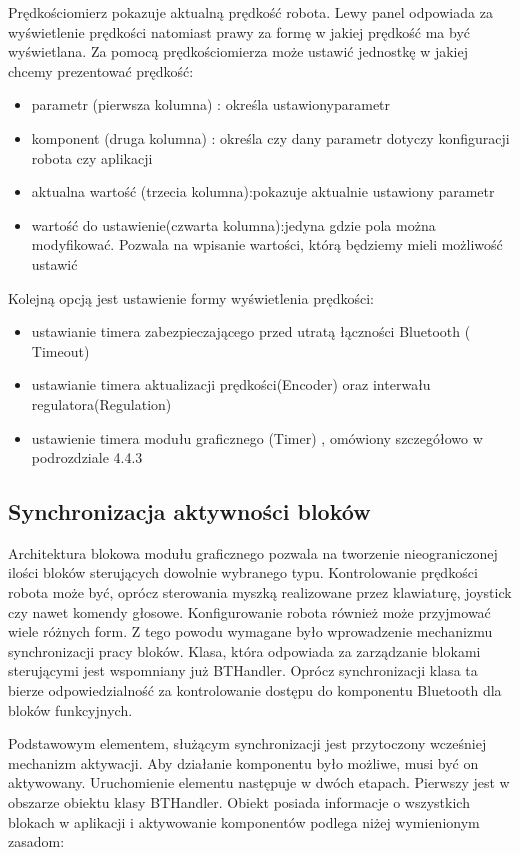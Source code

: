\documentclass[eng,printmode]{mgr}
\begin{document}
Prędkościomierz pokazuje aktualną prędkość robota. Lewy panel odpowiada za wyświetlenie prędkości natomiast prawy za formę w jakiej prędkość ma być wyświetlana. Za pomocą prędkościomierza może ustawić jednostkę w jakiej chcemy prezentować  prędkość:
\begin{itemize}
 \item parametr (pierwsza kolumna) : określa ustawionyparametr
 \item komponent (druga kolumna) : określa czy dany parametr dotyczy konfiguracji robota czy aplikacji 
 \item aktualna wartość (trzecia kolumna):pokazuje aktualnie ustawiony parametr
 \item wartość do ustawienie(czwarta kolumna):jedyna  gdzie pola można modyfikować. Pozwala na wpisanie wartości, którą będziemy mieli możliwość ustawić
\end{itemize}
Kolejną opcją jest ustawienie formy wyświetlenia prędkości:
\begin{itemize}
 \item ustawianie timera zabezpieczającego przed utratą łączności Bluetooth ( Timeout)
 \item ustawianie timera aktualizacji prędkości(Encoder) oraz interwału regulatora(Regulation)
 \item ustawienie timera modułu graficznego (Timer) , omówiony szczegółowo w podrozdziale 4.4.3
\end{itemize}

\newpage
  \subsection{Synchronizacja aktywności bloków}

Architektura blokowa modułu graficznego pozwala na tworzenie nieograniczonej ilości bloków sterujących dowolnie wybranego typu. Kontrolowanie prędkości robota może być, oprócz sterowania myszką realizowane przez klawiaturę, joystick czy nawet komendy głosowe. Konfigurowanie robota również może przyjmować wiele różnych form. Z tego powodu wymagane było wprowadzenie mechanizmu synchronizacji pracy bloków. Klasa, która odpowiada za zarządzanie blokami sterującymi jest  wspomniany już BTHandler. Oprócz synchronizacji klasa ta bierze odpowiedzialność za kontrolowanie  dostępu do komponentu Bluetooth dla bloków funkcyjnych.  

Podstawowym elementem, służącym synchronizacji jest przytoczony wcześniej mechanizm aktywacji. Aby działanie komponentu było możliwe, musi być on aktywowany. Uruchomienie elementu następuje w dwóch etapach. Pierwszy jest w obszarze obiektu klasy BTHandler. Obiekt posiada informacje o wszystkich blokach w aplikacji i aktywowanie komponentów podlega niżej wymienionym zasadom:
\end{document}

